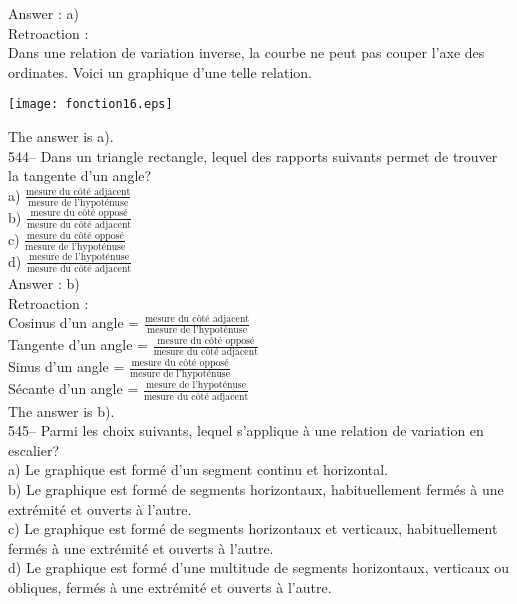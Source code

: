 ﻿\documentclass[letterpaper, 12pt]{article}
\begin{document}
Answer : a)\\

Retroaction : \\
Dans une relation de variation inverse, la courbe ne peut pas couper
l'axe des ordinates. Voici un graphique d'une telle relation.
    \begin{center}
    \texttt{[image: fonction16.eps]}
    \end{center}
The answer is a).\\

544-- Dans un triangle rectangle, lequel des rapports suivants permet de
trouver la tangente d'un angle?\\[2mm]
a) $\frac{\textrm{mesure du c\^ot\'e adjacent}}{\textrm{mesure de
l'hypot\'enuse}}$\\[2mm]
b) $\frac{\textrm{mesure du c\^ot\'e oppos\'e}}{\textrm{mesure du c\^ot\'e
adjacent}}$\\[2mm]
c) $\frac{\textrm{mesure du c\^ot\'e oppos\'e}}{\textrm{mesure de
l'hypot\'enuse}}$\\[2mm]
d) $\frac{\textrm{mesure de l'hypot\'enuse}}{\textrm{mesure du c\^ot\'e
adjacent}}$\\

Answer : b)\\

Retroaction : \\
Cosinus d'un angle = $\frac{\textrm{mesure du c\^ot\'e
adjacent}}{\textrm{mesure de l'hypot\'enuse}}$\\[2mm]
Tangente d'un angle = $\frac{\textrm{mesure du c\^ot\'e
oppos\'e}}{\textrm{mesure du c\^ot\'e adjacent}}$\\[2mm]
Sinus d'un angle = $\frac{\textrm{mesure du c\^ot\'e
oppos\'e}}{\textrm{mesure de l'hypot\'enuse}}$\\[2mm]
S\'ecante d'un angle =  $\frac{\textrm{mesure de
l'hypot\'enuse}}{\textrm{mesure du c\^ot\'e adjacent}}$\\[2mm]
The answer is b).\\

545-- Parmi les choix suivants, lequel s'applique \`a une relation de
variation en escalier?\\
a) Le graphique est form\'e d'un segment continu et horizontal. \\
b) Le graphique est form\'e de segments horizontaux, habituellement ferm\'es
\`a une extr\'emit\'e et ouverts \`a l'autre.\\
c) Le graphique est form\'e de segments horizontaux et verticaux,
habituellement ferm\'es \`a une extr\'emit\'e et ouverts \`a l'autre.\\
d) Le graphique est form\'e d'une multitude de segments horizontaux,
verticaux ou obliques, ferm\'es \`a une extr\'emit\'e et ouverts \`a
l'autre.\\
\end{document}
